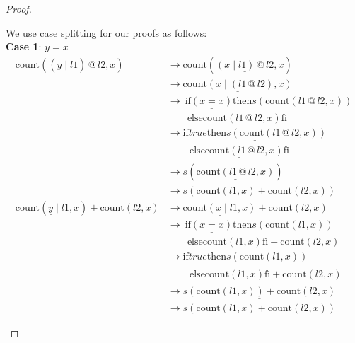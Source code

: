 \documentclass[12pt, a4paper]{article}
\newcommand{\rel}[1]{\mathrel{#1}}
\newcommand{\rmx}[1]{\mathrm{#1}}
\newcommand{\larrow}{\longrightarrow}
\newcommand{\under}{\underline}
\begin{document}
\begin{proof}
\begin{description}
We use case splitting for our proofs as follows: \\
\textbf{Case 1}: $y = x$
\begin{align*}
\rmx{count}((\under{y} \mid l1) \rel{@} l2, x)
	&\larrow \rmx{count}(\under{(x \mid l1) \rel{@} l2}, x) \tag{by case splitting} \\
	&\larrow \under{\rmx{count}(x \mid (l1 \rel{@} l2), x)} \tag{by @2} \\
	&\larrow\ \rel{\rmx{if}} \under{(x = x)} \rel{\rmx{then}} s(\rmx{count}(l1 \rel{@} l2, x)) \\
	&\quad \quad \rel{\rmx{else}} \rmx{count}(l1 \rel{@} l2, x) \rel{\rmx{fi}} \tag{by cnt2} \\
	&\larrow \under{\rel{\rmx{if}} true \rel{\rmx{then}} s(\rmx{count}(l1 \rel{@} l2, x))} \\
	&\quad \quad\ \under{\rel{\rmx{else}} \rmx{count}(l1 \rel{@} l2, x) \rel{\rmx{fi}}} \tag{by equality} \\
	&\larrow s(\under{\rmx{count}(l1 \rel{@} l2, x)}) \tag{by if1} \\
	&\larrow s(\rmx{count}(l1, x) + \rmx{count}(l2, x)) \tag{by IH} \\
\rmx{count}(\under{y} \mid l1, x) + \rmx{count}(l2, x)
	&\larrow \under{\rmx{count}(x \mid l1, x)} + \rmx{count}(l2, x) \tag{by case splitting} \\
	&\larrow\ \rel{\rmx{if}} \under{(x = x)} \rel{\rmx{then}} s(\rmx{count}(l1, x)) \\
	&\quad \quad \rel{\rmx{else}} \rmx{count}(l1, x) \rel{\rmx{fi}} + \rmx{count}(l2, x) \tag{by cnt2} \\
	&\larrow \under{\rel{\rmx{if}} true \rel{\rmx{then}} s(\rmx{count}(l1, x))} \\
	&\quad \quad\ \under{\rel{\rmx{else}} \rmx{count}(l1, x) \rel{\rmx{fi}}} + \rmx{count}(l2, x) \tag{by equality} \\
	&\larrow \under{s(\rmx{count}(l1, x)) + \rmx{count}(l2, x)} \tag{by if1} \\
	&\larrow s(\rmx{count}(l1, x) + \rmx{count}(l2, x)) \tag{by +2}
\end{align*}


\end{description}
\end{proof}
\end{document}
